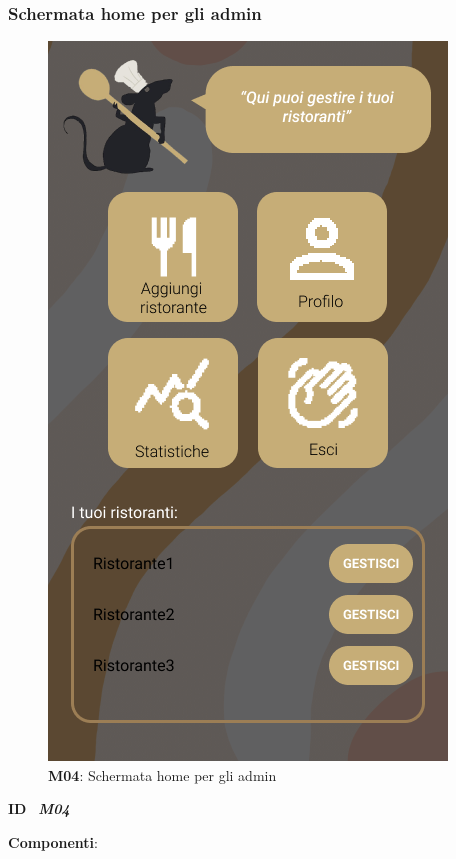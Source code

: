         \subsubsection{Schermata home per gli admin}
        \begin{figure}[H]
            \centering
            \includegraphics[scale=0.35]{assets/Mockup/Mockup_AdminDash.png}
            \caption{\textbf{M04}: Schermata home per gli admin}\label{fig:Mockup_AdminDashboard}
        \end{figure}
        \begin{flushleft}
            \textbf{ID} \ \Large{\textit{\textbf{M04}}} \\
        \end{flushleft}
        \textbf{Componenti}:

